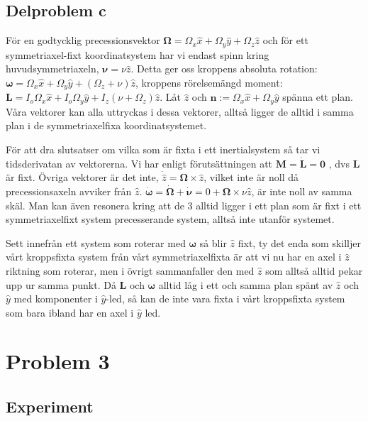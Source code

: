 \documentclass[12pt,a4paper]{article}
\begin{document}
	\subsection{Delproblem c}
		För en godtycklig precessionsvektor $\boldsymbol{\Omega}= \Omega_x \hat{x} + \Omega_y \hat{y} + \Omega_z \hat{z}$
		och för ett symmetriaxel-fixt 
		koordinatsystem har vi endast spinn kring huvudsymmetriaxeln, $\boldsymbol{\nu}=\nu \hat{z}$.
		Detta ger oss kroppens absoluta rotation: 
		$\boldsymbol{\omega}=\Omega_x \hat{x} + \Omega_y \hat{y} + (\Omega_z + \nu )\hat{z}$, kroppens rörelsemängd moment: 
		$\mathbf{L}=I_o \Omega_x \hat{x} + I_o \Omega_y \hat{y} + I_z (\nu + \Omega_z) \hat{z}$.
		Låt $\hat{z}$ och $\mathbf{n} := \Omega_x \hat{x} + \Omega_y \hat{y}$ 
		spänna ett plan. Våra vektorer kan alla uttryckas i dessa vektorer, alltså ligger de alltid i samma plan i de symmetriaxelfixa koordinatsystemet. 
		
		
		För att dra slutsatser om vilka som är fixta i ett inertialsystem så tar vi tidsderivatan av
		vektorerna. Vi har enligt förutsättningen att $\mathbf{M} = \dot{\mathbf{L}} = \mathbf{0}$ ,
		dvs $\mathbf{L}$ är fixt. Övriga vektorer är det inte, $\dot{\hat{z}}=\boldsymbol{\Omega} \times \hat{z}$,
		vilket inte är noll då precessionsaxeln avviker från $\hat{z}$. $\dot{\boldsymbol{\omega}} = \dot{\boldsymbol{\Omega}}+\dot{\boldsymbol{\nu}} =
		0 + \boldsymbol{\Omega} \times \nu \hat{z}$, är inte noll av samma skäl.
		Man kan även resonera kring att de 3 alltid ligger i ett plan som är fixt i 
		ett symmetriaxelfixt system precesserande system, alltså inte utanför systemet.
		
		Sett innefrån ett system som roterar med $\boldsymbol{\omega}$ så blir $\hat{z}$ fixt, ty det enda som skilljer vårt kroppsfixta system från 
		vårt symmetriaxelfixta är att vi nu har en axel i $\hat{z}$ riktning som roterar, men i övrigt sammanfaller den med $\hat{z}$ som alltså alltid pekar upp ur samma punkt.
		Då $\mathbf{L}$ och $\boldsymbol{\omega}$ alltid låg i ett och samma plan spänt av $\hat{z}$ och $\hat{y}$ med komponenter i $\hat{y}$-led, så kan de inte vara fixta i vårt kroppsfixta system som bara ibland har en axel i $\hat{y}$ led.
		

	
\section{Problem 3}
	
	
	\subsection{Experiment}
		
\end{document}
